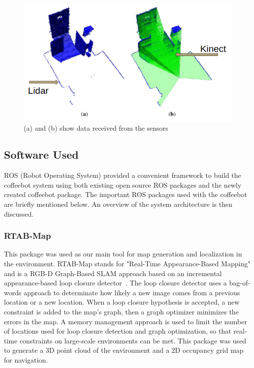 \documentclass[letterpaper, 10 pt, conference]{ieeeconf}  %
\begin{document}
	\begin{figure}[!ht]
		\centering
		\includegraphics[width=1.0\columnwidth]{Figures/lidarKinect}
		\caption{(a) and (b) show data received from the sensors }
		\label{hardware}
	\end{figure}

\subsection{Software Used}

ROS (Robot Operating System) provided a convenient framework to build the coffeebot system using both existing open source ROS packages and the newly created coffeebot package. The important ROS packages used with the coffeebot are briefly mentioned below. An overview of the system architecture is then discussed.

\subsubsection{RTAB-Map}

This package was used as our main tool for map generation and localization in the environment. RTAB-Map stands for "Real-Time Appearance-Based Mapping" and is a RGB-D Graph-Based SLAM approach based on an incremental appearance-based loop closure detector~\cite{rtabmap2014}. The loop closure detector uses a bag-of-words approach to determinate how likely a new image comes from a previous location or a new location. When a loop closure hypothesis is accepted, a new constraint is added to the map's graph, then a graph optimizer minimizes the errors in the map. A memory management approach is used to limit the number of locations used for loop closure detection and graph optimization, so that real-time constraints on large-scale environments can be met. This package was used to generate a 3D point cloud of the environment and a 2D occupancy grid map for navigation.
\end{document}
